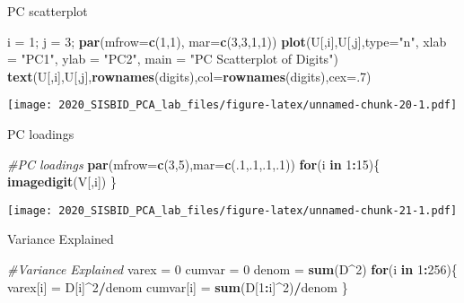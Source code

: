 \documentclass[
]{article}
\newenvironment{Shaded}{\begin{snugshade}}{\end{snugshade}}
\newcommand{\CommentTok}[1]{\textcolor[rgb]{0.56,0.35,0.01}{\textit{#1}}}
\newcommand{\ControlFlowTok}[1]{\textcolor[rgb]{0.13,0.29,0.53}{\textbf{#1}}}
\newcommand{\DataTypeTok}[1]{\textcolor[rgb]{0.13,0.29,0.53}{#1}}
\newcommand{\DecValTok}[1]{\textcolor[rgb]{0.00,0.00,0.81}{#1}}
\newcommand{\KeywordTok}[1]{\textcolor[rgb]{0.13,0.29,0.53}{\textbf{#1}}}
\newcommand{\NormalTok}[1]{#1}
\newcommand{\OperatorTok}[1]{\textcolor[rgb]{0.81,0.36,0.00}{\textbf{#1}}}
\newcommand{\StringTok}[1]{\textcolor[rgb]{0.31,0.60,0.02}{#1}}
\begin{document}
PC scatterplot

\begin{Shaded}
\begin{Highlighting}[]
\NormalTok{i =}\StringTok{ }\DecValTok{1}\NormalTok{; j =}\StringTok{ }\DecValTok{3}\NormalTok{;}
\KeywordTok{par}\NormalTok{(}\DataTypeTok{mfrow=}\KeywordTok{c}\NormalTok{(}\DecValTok{1}\NormalTok{,}\DecValTok{1}\NormalTok{), }\DataTypeTok{mar=}\KeywordTok{c}\NormalTok{(}\DecValTok{3}\NormalTok{,}\DecValTok{3}\NormalTok{,}\DecValTok{1}\NormalTok{,}\DecValTok{1}\NormalTok{))}
\KeywordTok{plot}\NormalTok{(U[,i],U[,j],}\DataTypeTok{type=}\StringTok{"n"}\NormalTok{, }\DataTypeTok{xlab =} \StringTok{"PC1"}\NormalTok{, }\DataTypeTok{ylab =} \StringTok{"PC2"}\NormalTok{, }\DataTypeTok{main =} \StringTok{"PC Scatterplot of Digits"}\NormalTok{)}
\KeywordTok{text}\NormalTok{(U[,i],U[,j],}\KeywordTok{rownames}\NormalTok{(digits),}\DataTypeTok{col=}\KeywordTok{rownames}\NormalTok{(digits),}\DataTypeTok{cex=}\NormalTok{.}\DecValTok{7}\NormalTok{)}
\end{Highlighting}
\end{Shaded}

\texttt{[image: 2020\_SISBID\_PCA\_lab\_files/figure-latex/unnamed-chunk-20-1.pdf]}

PC loadings

\begin{Shaded}
\begin{Highlighting}[]
\CommentTok{#PC loadings}
\KeywordTok{par}\NormalTok{(}\DataTypeTok{mfrow=}\KeywordTok{c}\NormalTok{(}\DecValTok{3}\NormalTok{,}\DecValTok{5}\NormalTok{),}\DataTypeTok{mar=}\KeywordTok{c}\NormalTok{(.}\DecValTok{1}\NormalTok{,.}\DecValTok{1}\NormalTok{,.}\DecValTok{1}\NormalTok{,.}\DecValTok{1}\NormalTok{))}
\ControlFlowTok{for}\NormalTok{(i }\ControlFlowTok{in} \DecValTok{1}\OperatorTok{:}\DecValTok{15}\NormalTok{)\{}
  \KeywordTok{imagedigit}\NormalTok{(V[,i])}
\NormalTok{\}}
\end{Highlighting}
\end{Shaded}

\texttt{[image: 2020\_SISBID\_PCA\_lab\_files/figure-latex/unnamed-chunk-21-1.pdf]}

Variance Explained

\begin{Shaded}
\begin{Highlighting}[]
\CommentTok{#Variance Explained}
\NormalTok{varex =}\StringTok{ }\DecValTok{0}
\NormalTok{cumvar =}\StringTok{ }\DecValTok{0}
\NormalTok{denom =}\StringTok{ }\KeywordTok{sum}\NormalTok{(D}\OperatorTok{^}\DecValTok{2}\NormalTok{)}
\ControlFlowTok{for}\NormalTok{(i }\ControlFlowTok{in} \DecValTok{1}\OperatorTok{:}\DecValTok{256}\NormalTok{)\{}
\NormalTok{  varex[i] =}\StringTok{ }\NormalTok{D[i]}\OperatorTok{^}\DecValTok{2}\OperatorTok{/}\NormalTok{denom}
\NormalTok{  cumvar[i] =}\StringTok{ }\KeywordTok{sum}\NormalTok{(D[}\DecValTok{1}\OperatorTok{:}\NormalTok{i]}\OperatorTok{^}\DecValTok{2}\NormalTok{)}\OperatorTok{/}\NormalTok{denom}
\NormalTok{\}}
\end{Highlighting}
\end{Shaded}
\end{document}
